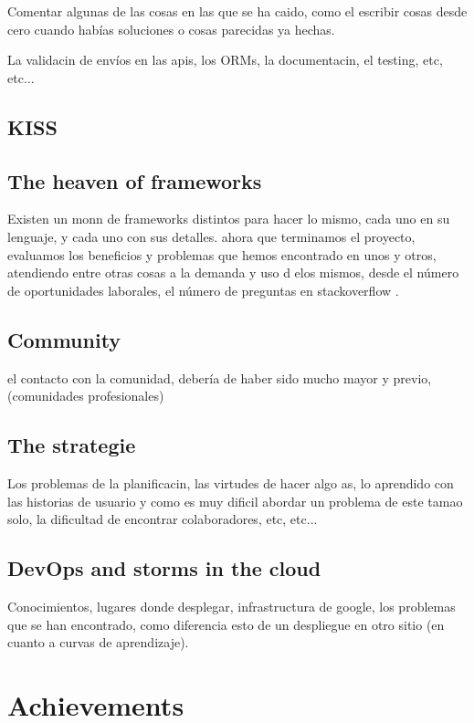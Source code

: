 \documentclass[oneside,english,titlepage]{scrbook}
\begin{document}
Comentar algunas de las cosas en las que se ha caido, como el escribir
cosas desde cero cuando habías soluciones o cosas parecidas ya hechas.

La validacin de envíos en las apis, los ORMs, la documentacin, el
testing, etc, etc...

\section{KISS}

\section{The heaven of frameworks}

Existen un monn de frameworks distintos para hacer lo mismo, cada
uno en su lenguaje, y cada uno con sus detalles. ahora que terminamos
el proyecto, evaluamos los beneficios y problemas que hemos encontrado
en unos y otros, atendiendo entre otras cosas a la demanda y uso d
elos mismos, desde el número de oportunidades laborales, el número
de preguntas en stackoverflow .

\section{Community}

el contacto con la comunidad, debería de haber sido mucho mayor y
previo, (comunidades profesionales)

\section{The strategie}

Los problemas de la planificacin, las virtudes de hacer algo as,
lo aprendido con las historias de usuario y como es muy dificil abordar
un problema de este tamao solo, la dificultad de encontrar colaboradores,
etc, etc...

\section{DevOps and storms in the cloud}

Conocimientos, lugares donde desplegar, infrastructura de google,
los problemas que se han encontrado, como diferencia esto de un despliegue
en otro sitio (en cuanto a curvas de aprendizaje).

\chapter{Achievements}
\end{document}
